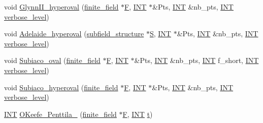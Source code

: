 \begin{DoxyCompactItemize}
\item 
void \mbox{\hyperlink{data_8_c_a7441fa50c10edf9ce1e898ca66ca55cb}{Glynn\+I\+I\+\_\+hyperoval}} (\mbox{\hyperlink{classfinite__field}{finite\+\_\+field}} $\ast$\mbox{\hyperlink{simeon_8_c_a21a61c535ff7d9d4b674461d3b19fffa}{F}}, \mbox{\hyperlink{galois_8h_a09fddde158a3a20bd2dcadb609de11dc}{I\+NT}} $\ast$\&Pts, \mbox{\hyperlink{galois_8h_a09fddde158a3a20bd2dcadb609de11dc}{I\+NT}} \&nb\+\_\+pts, \mbox{\hyperlink{galois_8h_a09fddde158a3a20bd2dcadb609de11dc}{I\+NT}} \mbox{\hyperlink{simeon_8_c_a818073fbcc2f439e7c56952f67386122}{verbose\+\_\+level}})
\item 
void \mbox{\hyperlink{data_8_c_acca8a45187a8ab1f6adc350194f17b87}{Adelaide\+\_\+hyperoval}} (\mbox{\hyperlink{classsubfield__structure}{subfield\+\_\+structure}} $\ast$\mbox{\hyperlink{simeon_8_c_adab47f8243f1b5a2c31df2535d6b37d0}{S}}, \mbox{\hyperlink{galois_8h_a09fddde158a3a20bd2dcadb609de11dc}{I\+NT}} $\ast$\&Pts, \mbox{\hyperlink{galois_8h_a09fddde158a3a20bd2dcadb609de11dc}{I\+NT}} \&nb\+\_\+pts, \mbox{\hyperlink{galois_8h_a09fddde158a3a20bd2dcadb609de11dc}{I\+NT}} \mbox{\hyperlink{simeon_8_c_a818073fbcc2f439e7c56952f67386122}{verbose\+\_\+level}})
\item 
void \mbox{\hyperlink{data_8_c_aad60d8b485bc6d324431f2ee7a543cb1}{Subiaco\+\_\+oval}} (\mbox{\hyperlink{classfinite__field}{finite\+\_\+field}} $\ast$\mbox{\hyperlink{simeon_8_c_a21a61c535ff7d9d4b674461d3b19fffa}{F}}, \mbox{\hyperlink{galois_8h_a09fddde158a3a20bd2dcadb609de11dc}{I\+NT}} $\ast$\&Pts, \mbox{\hyperlink{galois_8h_a09fddde158a3a20bd2dcadb609de11dc}{I\+NT}} \&nb\+\_\+pts, \mbox{\hyperlink{galois_8h_a09fddde158a3a20bd2dcadb609de11dc}{I\+NT}} f\+\_\+short, \mbox{\hyperlink{galois_8h_a09fddde158a3a20bd2dcadb609de11dc}{I\+NT}} \mbox{\hyperlink{simeon_8_c_a818073fbcc2f439e7c56952f67386122}{verbose\+\_\+level}})
\item 
void \mbox{\hyperlink{data_8_c_a7653c4fab644da8c6527a23977f3670f}{Subiaco\+\_\+hyperoval}} (\mbox{\hyperlink{classfinite__field}{finite\+\_\+field}} $\ast$\mbox{\hyperlink{simeon_8_c_a21a61c535ff7d9d4b674461d3b19fffa}{F}}, \mbox{\hyperlink{galois_8h_a09fddde158a3a20bd2dcadb609de11dc}{I\+NT}} $\ast$\&Pts, \mbox{\hyperlink{galois_8h_a09fddde158a3a20bd2dcadb609de11dc}{I\+NT}} \&nb\+\_\+pts, \mbox{\hyperlink{galois_8h_a09fddde158a3a20bd2dcadb609de11dc}{I\+NT}} \mbox{\hyperlink{simeon_8_c_a818073fbcc2f439e7c56952f67386122}{verbose\+\_\+level}})
\item 
\mbox{\hyperlink{galois_8h_a09fddde158a3a20bd2dcadb609de11dc}{I\+NT}} \mbox{\hyperlink{data_8_c_a30ac3b374e7cac53bd723d0826457ddf}{O\+Keefe\+\_\+\+Penttila\+\_}} (\mbox{\hyperlink{classfinite__field}{finite\+\_\+field}} $\ast$\mbox{\hyperlink{simeon_8_c_a21a61c535ff7d9d4b674461d3b19fffa}{F}}, \mbox{\hyperlink{galois_8h_a09fddde158a3a20bd2dcadb609de11dc}{I\+NT}} \mbox{\hyperlink{alphabet2_8_c_ac310d9181e916ba43604099aee272c71}{t}})

\end{DoxyCompactItemize}
